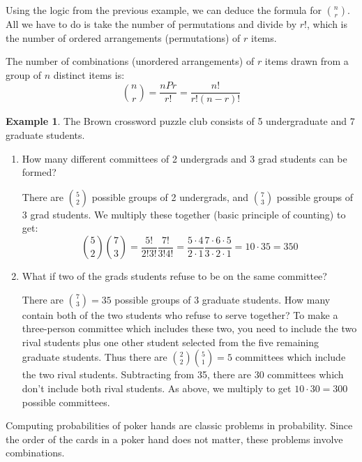 \documentclass[12pt]{article}
\theoremstyle{definition}
\newtheorem*{example}{Example}
\theoremstyle{remark}
\begin{document}
Using the logic from the previous example, we can deduce the formula for $\binom{n}{r}$. All we have to do is take the number of permutations and divide by $r!$, which is the number of ordered arrangements (permutations) of $r$ items.

\begin{framed}
The number of combinations (unordered arrangements) of $r$ items drawn from a group of $n$ distinct items is:
\[
\binom{n}{r} = \frac{nPr}{r!} = \frac{n!}{r!(n-r)!}
\]
\end{framed}

\begin{example}The Brown crossword puzzle club consists of 5 undergraduate and 7 graduate students.
\begin{enumerate}
\item How many different committees of 2 undergrads and 3 grad students can be formed?

There are $\binom{5}{2}$ possible groups of 2 undergrads, and $\binom{7}{3}$ possible groups of 3 grad students. We multiply these together (basic principle of counting) to get:
\[
\binom{5}{2} \binom{7}{3}  = \frac{5!}{2!3!} \frac{7!}{3!4!} = \frac{5\cdot4}{2\cdot1} \frac{7\cdot6\cdot5}{3\cdot2\cdot1} = 10 \cdot 35 = 350
\]

\item What if two of the grads students refuse to be on the same committee?

There are $\binom{7}{3} = 35$ possible groups of 3 graduate students. How many contain both of the two students who refuse to serve together? To make a three-person committee which includes these two, you need to include the two rival students plus one other student selected from the five remaining graduate students. Thus there are $\binom{2}{2}\binom{5}{1} = 5$ committees which include the two rival students. Subtracting from 35, there are 30 committees which don't include both rival students. As above, we multiply to get $10 \cdot 30 = 300$ possible committees.
\end{enumerate}
\end{example}

Computing probabilities of poker hands are classic problems in probability. Since the order of the cards in a poker hand does not matter, these problems involve combinations.
\end{document}
